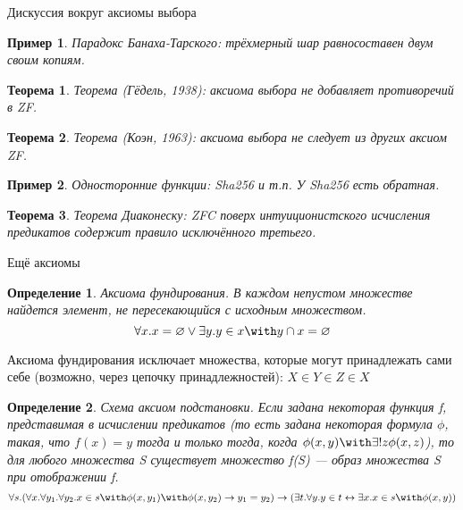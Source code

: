 \documentclass[aspectratio=169]{beamer}
\newtheorem{thm}{Теорема}[section]
\newtheorem{dfn}{Определение}[section]
\newtheorem{exm}{Пример}[section]
\begin{document}
\begin{frame}{Дискуссия вокруг аксиомы выбора}
\begin{exm}Парадокс Банаха-Тарского: трёхмерный шар равносоставен двум своим копиям.\end{exm}\pause
\begin{thm}Теорема (Гёдель, 1938): аксиома выбора не добавляет противоречий в ZF.\end{thm}\pause
\begin{thm}Теорема (Коэн, 1963): аксиома выбора не следует из других аксиом ZF.\end{thm}\pause
\begin{exm}Односторонние функции: Sha256 и т.п. У Sha256 есть обратная.\end{exm}\pause
\begin{thm}Теорема Диаконеску: ZFC поверх интуиционистского исчисления предикатов содержит правило исключённого третьего.\end{thm}
\end{frame}

\begin{frame}{Ещё аксиомы}
\begin{dfn}Аксиома фундирования. 
В каждом непустом множестве найдется элемент, не пересекающийся с исходным множеством.
$$\forall x .x = \varnothing \vee \exists y .y \in x \with y \cap x = \varnothing$$
\end{dfn}

Аксиома фундирования исключает множества, которые могут принадлежать 
сами себе (возможно, через цепочку принадлежностей):
$X \in Y \in Z \in X$\pause

\begin{dfn}Схема аксиом подстановки. 
Если задана некоторая функция f, представимая в исчислении предикатов
(то есть задана некоторая формула $\phi$, такая, что $f(x) = y$
тогда и только тогда, когда $\phi(x,y) \with \exists ! z \phi(x,z)$),
то для любого множества S существует множество f(S) --- образ
множества S при отображении f.
$$\forall s .(\forall x .\forall y_1 .\forall y_2 .x \in s \with \phi (x,y_1) \with \phi
(x,y_2) \rightarrow y_1=y_2) \rightarrow 
(\exists t .\forall y .y \in t
\leftrightarrow \exists x . x \in s \with \phi (x,y)) $$
\end{dfn}
\end{frame}
\end{document}
